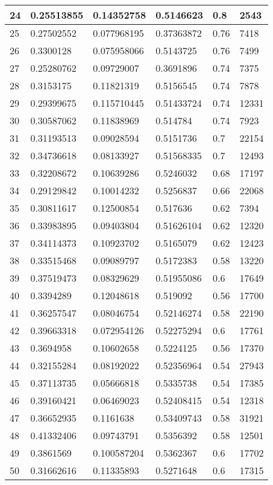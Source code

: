 \begin{longtable}{|l|l|l|l|l|l|}
24 & 0.25513855 & 0.14352758 & 0.5146623 & 0.8 & 2543 \\ \hline 
25 & 0.27502552 & 0.077968195 & 0.37363872 & 0.76 & 7418 \\ \hline 
26 & 0.3300128 & 0.075958066 & 0.5143725 & 0.76 & 7499 \\ \hline 
27 & 0.25280762 & 0.09729007 & 0.3691896 & 0.74 & 7375 \\ \hline 
28 & 0.3153175 & 0.11821319 & 0.5156545 & 0.74 & 7878 \\ \hline 
29 & 0.29399675 & 0.115710445 & 0.51433724 & 0.74 & 12331 \\ \hline 
30 & 0.30587062 & 0.11838969 & 0.514784 & 0.74 & 7923 \\ \hline 
31 & 0.31193513 & 0.09028594 & 0.5151736 & 0.7 & 22154 \\ \hline 
32 & 0.34736618 & 0.08133927 & 0.51568335 & 0.7 & 12493 \\ \hline 
33 & 0.32208672 & 0.10639286 & 0.5246032 & 0.68 & 17197 \\ \hline 
34 & 0.29129842 & 0.10014232 & 0.5256837 & 0.66 & 22068 \\ \hline 
35 & 0.30811617 & 0.12500854 & 0.517636 & 0.62 & 7394 \\ \hline 
36 & 0.33983895 & 0.09403804 & 0.51626104 & 0.62 & 12320 \\ \hline 
37 & 0.34114373 & 0.10923702 & 0.5165079 & 0.62 & 12423 \\ \hline 
38 & 0.33515468 & 0.09089797 & 0.5172383 & 0.58 & 13220 \\ \hline 
39 & 0.37519473 & 0.08329629 & 0.51955086 & 0.6 & 17649 \\ \hline 
40 & 0.3394289 & 0.12048618 & 0.519092 & 0.56 & 17700 \\ \hline 
41 & 0.36257547 & 0.08046754 & 0.52146274 & 0.58 & 22190 \\ \hline 
42 & 0.39663318 & 0.072954126 & 0.52275294 & 0.6 & 17761 \\ \hline 
43 & 0.3694958 & 0.10602658 & 0.5224125 & 0.56 & 17370 \\ \hline 
44 & 0.32155284 & 0.08192022 & 0.52356964 & 0.54 & 27943 \\ \hline 
45 & 0.37113735 & 0.05666818 & 0.5335738 & 0.54 & 17385 \\ \hline 
46 & 0.39160421 & 0.06469023 & 0.52408415 & 0.54 & 12318 \\ \hline 
47 & 0.36652935 & 0.1161638 & 0.53409743 & 0.58 & 31921 \\ \hline 
48 & 0.41332406 & 0.09743791 & 0.5356392 & 0.58 & 12501 \\ \hline 
49 & 0.3861569 & 0.100587204 & 0.5362367 & 0.6 & 17702 \\ \hline 
50 & 0.31662616 & 0.11335893 & 0.5271648 & 0.6 & 17315 \\ \hline 
\end{longtable}
